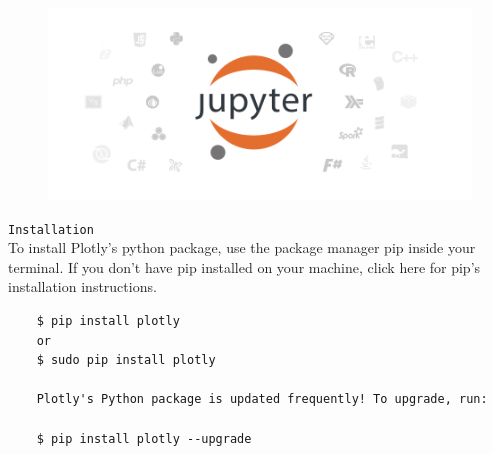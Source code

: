 \begin{frame}
	\begin{figure}
\centering
\includegraphics[width=1.3\linewidth]{jupyter}
\end{figure}
\end{frame}
\begin{frame}
\texttt{Installation}\\
To install Plotly's python package, use the package manager pip inside your terminal.
If you don't have pip installed on your machine, click here for pip's installation instructions. 
\end{frame}
\begin{frame}[fragile]
	\large
\begin{framed}
	\begin{verbatim}
	$ pip install plotly 
	or 
	$ sudo pip install plotly 
	
	Plotly's Python package is updated frequently! To upgrade, run: 
	
	$ pip install plotly --upgrade
	\end{verbatim}
\end{framed}
\end{frame}